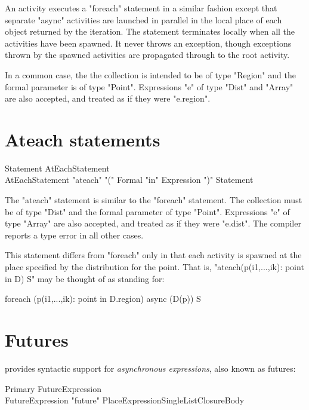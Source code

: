 An activity executes a \xcd"foreach" statement in a similar fashion
except that separate \xcd"async" activities are launched in parallel
in the local place of each object returned by the iteration.
The statement
terminates locally when all the activities have been spawned. It never
throws an exception, though exceptions thrown by the spawned
activities are propagated through to the root activity.

In a common case, the
the collection is intended to be of type
\xcd"Region" and the formal parameter is of type \xcd"Point".  Expressions \xcd"e" of type \xcd"Dist" and
\xcd"Array" are also accepted, and treated as if they were \xcd"e.region".


\section{Ateach statements}

\begin{grammar}
Statement \: AtEachStatement \\
AtEachStatement \:
      \xcd"ateach" \xcd"(" Formal \xcd"in" Expression \xcd")"
         Statement \\
\end{grammar}

The \xcd"ateach" statement is similar to the \xcd"foreach"
statement.  The collection must be of type \xcd"Dist"
and the formal parameter of type \xcd"Point".
Expressions \xcd"e" of type \xcd"Array" are also accepted, and treated
as if they were \xcd"e.dist". The compiler reports a type error
in all other cases.

This statement differs from \xcd"foreach" only in
that each activity is spawned at the place specified by the
distribution for the point. That is, 
\xcd"ateach(p(i1,...,ik): point in D) S" may
be thought of as standing for:
\begin{xten}
foreach (p(i1,...,ik): point in D.region) 
  async (D(p)) S
\end{xten}

\section{Futures}\label{XtenFutures}

\Xten{} provides syntactic support for {\em asynchronous expressions}, also
known as futures:

\begin{grammar}
Primary \: FutureExpression \\
FutureExpression \:
  \xcd"future" PlaceExpressionSingleList\opt ClosureBody
\end{grammar} 

